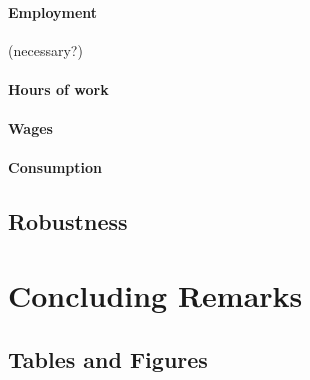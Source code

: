 \documentclass[10pt]{article}
\theoremstyle{definition}
\theoremstyle{remark}
\begin{document}
\paragraph{Employment} (necessary?)

\paragraph{Hours of work}

\paragraph{Wages} 

\paragraph{Consumption} 

\subsection{Robustness}\label{subsec:robust}


\section{Concluding Remarks}\label{sec:conc}


\newpage


\newpage
\begin{appendices}

\section{Tables and Figures}


\end{appendices}
\end{document}
